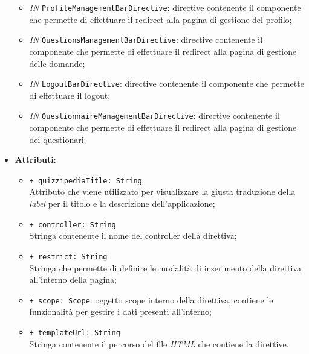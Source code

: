 \begin{itemize}
\begin{itemize}
		\item \textit{IN} \texttt{ProfileManagementBarDirective}: directive contenente il componente che permette di effettuare il redirect alla pagina di gestione del profilo;
		\item \textit{IN} \texttt{QuestionsManagementBarDirective}: directive contenente il componente che permette di effettuare il redirect alla pagina di gestione delle domande;
		\item \textit{IN} \texttt{LogoutBarDirective}: directive contenente il componente che permette di effettuare il logout;
		\item \textit{IN} \texttt{QuestionnaireManagementBarDirective}: directive contenente il componente che permette di effettuare il redirect alla pagina di gestione dei questionari;
	\end{itemize}
	\item \textbf{Attributi}: 
	\begin{itemize}
		\item \texttt{+ quizzipediaTitle: String} \\ Attributo che viene utilizzato per visualizzare la giusta traduzione della \textit{label} per il titolo e la descrizione dell'applicazione;
		\item \texttt{+ controller: String} \\ Stringa contenente il nome del controller della direttiva;
		\item \texttt{+ restrict: String} \\ Stringa che permette di definire le modalità di inserimento della direttiva all'interno della pagina;
		\item \texttt{+ scope: Scope}: oggetto scope interno della direttiva, contiene le funzionalità per gestire i dati presenti all'interno;
		\item \texttt{+ templateUrl: String} \\ Stringa contenente il percorso del file \textit{HTML} che contiene la direttive.
	\end{itemize}
\end{itemize}